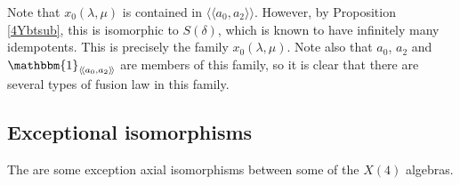\documentclass[11pt, a4paper]{article}
\theoremstyle{plain}
\theoremstyle{definition}
\newcommand\dl{\delta}
\newcommand\lm{\lambda}
\newcommand\lla{\langle\!\langle}
\newcommand\rra{\rangle\!\rangle}
\newcommand{\0}{\overline{0}}
\newcommand{\2}{\overline{2}}
\newcommand{\1}{\mathbbm{1}}
\begin{document}
Note that $x_0(\lm, \mu)$ is contained in $\lla a_0, a_2 \rra$.  However, by Proposition \ref{4Ybtsub}, this is isomorphic to $S(\dl)$, which is known to have infinitely many idempotents.  This is precisely the family $x_0(\lm, \mu)$.  Note also that $a_0$, $a_2$ and $\1_{\lla a_0, a_2 \rra}$ are members of this family, so it is clear that there are several types of fusion law in this family.



\subsection{Exceptional isomorphisms}

The are some exception axial isomorphisms between some of the $X(4)$ algebras.
\end{document}
